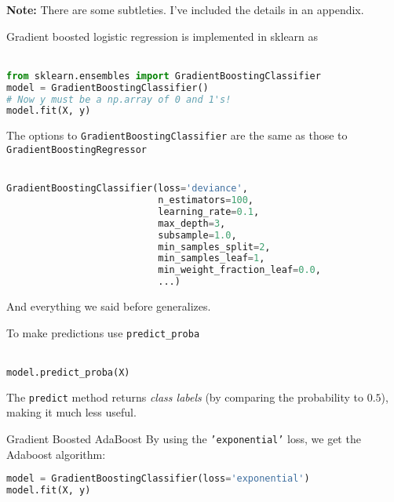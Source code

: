\begin{frame}
\textbf{Note:} There are some subtleties.  I've included the details in an appendix.
\end{frame}
%
\begin{frame}[fragile]
Gradient boosted logistic regression is implemented in sklearn as\\~\\

\begin{lstlisting}[language=python]
from sklearn.ensembles import GradientBoostingClassifier
model = GradientBoostingClassifier()
# Now y must be a np.array of 0 and 1's!
model.fit(X, y)
\end{lstlisting}
\end{frame}
%
\begin{frame}[fragile]
The options to \texttt{GradientBoostingClassifier} are the same as those to \texttt{GradientBoostingRegressor}\\~\\

\begin{lstlisting}[language=python]
GradientBoostingClassifier(loss='deviance',
                           n_estimators=100, 
                           learning_rate=0.1, 
                           max_depth=3,
                           subsample=1.0, 
                           min_samples_split=2, 
                           min_samples_leaf=1, 
                           min_weight_fraction_leaf=0.0,
                           ...)
\end{lstlisting}

And everything we said before generalizes.
\end{frame}
%
\begin{frame}[fragile]
To make predictions use \texttt{predict\_proba}\\~\\

\begin{lstlisting}[language=python]
model.predict_proba(X)
\end{lstlisting}

The \texttt{predict} method returns \textit{class labels} (by comparing the probability to $0.5$), making it much less useful.
\end{frame}
%
\begin{frame}[fragile]{Gradient Boosted AdaBoost}
By using the \texttt{'exponential'} loss, we get the Adaboost algorithm:

\begin{lstlisting}[language=python]
model = GradientBoostingClassifier(loss='exponential')
model.fit(X, y)
\end{lstlisting}

\end{frame}
